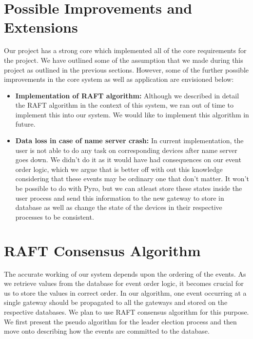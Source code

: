 \documentclass[12pt]{article}
\begin{document}
\section{Possible Improvements and Extensions}

Our project has a strong core which implemented all of the core requirements
for the project. We have outlined some of the assumption that we made during 
this project as outlined in the previous sections. However, some of the further 
possible improvements in the core system as well as application are envisioned
below:

\begin{itemize}
	\item \textbf{Implementation of RAFT algorithm: } Although we described in 
	detail the 	RAFT algorithm in the context of this system, we ran out of time 
	to implement this into our system. We would like to implement this algorithm 
	in future. 
	\item \textbf{Data loss in case of name server crash: } In current implementation, 
	the user is not able to do any task on corresponding devices after name server 
	goes down. We didn't do it as it would have had consequences 
	on our event order logic, which we argue that is better off with out this knowledge
	considering that these events may be ordinary one that don't matter. 
	 It won't be possible to do with Pyro, but we can atleast store these 
	states inside the user process and send this information to the new gateway
	to store in database as well as change the state of the devices in their respective
	processes to be consistent.
\end{itemize}


\section{RAFT Consensus Algorithm}

The accurate working of our system depends upon the ordering of the events. 
As we retrieve values from the database for event order logic, it becomes crucial for 
us to store the values in correct order. 
In our algorithm, one event occurring at a single gateway should be propagated to all
the gateways and stored on the respective databases. 
We plan to use RAFT consensus algorithm for this purpose. 
We first present the pseudo algorithm for the leader election 
process and then move onto describing how the events are committed
to the database. 
\end{document}
